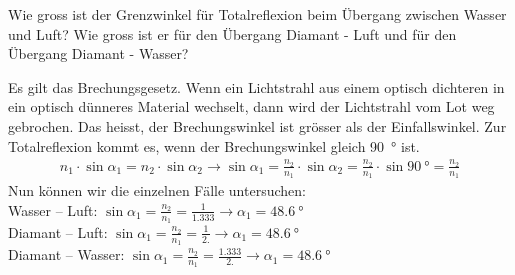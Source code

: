 \documentclass[12pt,a4paper,twoside]{article}
\begin{document}
\begin{aufgabe}
Wie gross ist der Grenzwinkel für Totalreflexion beim Übergang zwischen Wasser und Luft?
Wie gross ist er für den Übergang Diamant - Luft und für den Übergang Diamant - Wasser?	
\begin{loesung}
	Es gilt das Brechungsgesetz. Wenn ein Lichtstrahl aus einem optisch dichteren in ein optisch dünneres Material wechselt,
	dann wird der Lichtstrahl vom Lot weg gebrochen. Das heisst, der Brechungswinkel ist grösser als der Einfallswinkel.
	Zur Totalreflexion kommt es, wenn der Brechungswinkel gleich \SI{90}{\degree} ist.
		\begin{eqnarray*}
			n_1\cdot\sin\alpha_1 = n_2\cdot\sin\alpha_2 \to \sin\alpha_1=\frac{n_2}{n_1}\cdot\sin\alpha_2=\frac{n_2}{n_1}\cdot\sin\SI{90}{\degree}=\frac{n_2}{n_1}
		\end{eqnarray*}
		Nun können wir die einzelnen Fälle untersuchen:\\
		Wasser -- Luft: $\sin\alpha_1=\frac{n_2}{n_1}=\frac{1}{\num{1.333}} \to \alpha_1=\SI{48.6}{\degree}$\\
		Diamant -- Luft: $\sin\alpha_1=\frac{n_2}{n_1}=\frac{1}{\num{2.}} \to \alpha_1=\SI{48.6}{\degree}$\\
		Diamant -- Wasser: $\sin\alpha_1=\frac{n_2}{n_1}=\frac{1.333}{\num{2.}} \to \alpha_1=\SI{48.6}{\degree}$\\\\

\end{loesung}
\end{aufgabe}
\end{document}
